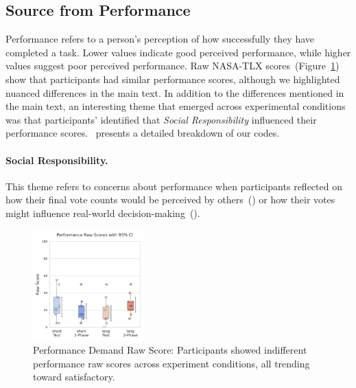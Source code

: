 \subsection{Source from Performance}
\label{apdx:performance}

Performance refers to a person's perception of how successfully they have completed a task. Lower values indicate good perceived performance, while higher values suggest poor perceived performance. Raw NASA-TLX scores~(Figure~\ref{fig:performance_cog_score}) show that participants had similar performance scores, although we highlighted nuanced differences in the main text. In addition to the differences mentioned in the main text, an interesting theme that emerged across experimental conditions was that participants' identified that \textit{Social Responsibility} influenced their performance scores.~ presents a detailed breakdown of our codes.

\paragraph{Social Responsibility.} This theme refers to concerns about performance when participants reflected on how their final vote counts would be perceived by others~() or how their votes might influence real-world decision-making~().

\begin{figure}[h]
    \centering
    \includegraphics[width=0.38\textwidth, trim=0 13 0 13, clip]{content/image/cog/Performance_scores.pdf}
    \captionsetup{width=0.9\linewidth, justification=justified}
    \caption{Performance Demand Raw Score: Participants showed indifferent performance raw scores across experiment conditions, all trending toward satisfactory.}
    \label{fig:performance_cog_score}
\end{figure}

